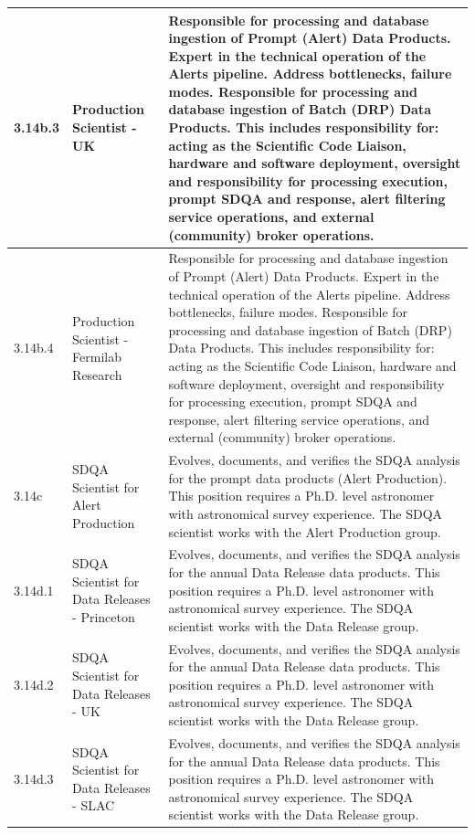 \begin{longtable} {|p{}|p{}|p{}|}
{3.14b.3}&{Production Scientist - UK}&{Responsible for processing and database ingestion of Prompt (Alert) Data Products. Expert in the technical operation of the Alerts pipeline. Address bottlenecks, failure modes. Responsible for processing and database ingestion of Batch (DRP) Data Products. This includes responsibility for: acting as the Scientific Code Liaison, hardware and software deployment, oversight and responsibility for processing execution, prompt SDQA and response, alert filtering service operations, and external (community) broker operations.} \\ \hline
{3.14b.4}&{Production Scientist - Fermilab Research}&{Responsible for processing and database ingestion of Prompt (Alert) Data Products. Expert in the technical operation of the Alerts pipeline. Address bottlenecks, failure modes. Responsible for processing and database ingestion of Batch (DRP) Data Products. This includes responsibility for: acting as the Scientific Code Liaison, hardware and software deployment, oversight and responsibility for processing execution, prompt SDQA and response, alert filtering service operations, and external (community) broker operations.} \\ \hline
{3.14c}&{SDQA Scientist for Alert Production}&{Evolves, documents, and verifies the SDQA analysis for the prompt data products (Alert Production). This position requires a Ph.D. level astronomer with astronomical survey experience. The SDQA scientist works with the Alert Production group.} \\ \hline
{3.14d.1}&{SDQA Scientist for Data Releases - Princeton}&{Evolves, documents, and verifies the SDQA analysis for the annual Data Release data products. This position requires a Ph.D. level astronomer with astronomical survey experience. The SDQA scientist works with the Data Release group.} \\ \hline
{3.14d.2}&{SDQA Scientist for Data Releases - UK}&{Evolves, documents, and verifies the SDQA analysis for the annual Data Release data products. This position requires a Ph.D. level astronomer with astronomical survey experience. The SDQA scientist works with the Data Release group.} \\ \hline
{3.14d.3}&{SDQA Scientist for Data Releases - SLAC}&{Evolves, documents, and verifies the SDQA analysis for the annual Data Release data products. This position requires a Ph.D. level astronomer with astronomical survey experience. The SDQA scientist works with the Data Release group.} \\ \hline

\end{longtable}
